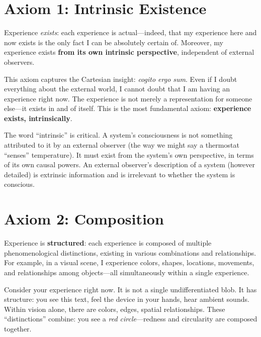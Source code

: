 \documentclass[11pt,a4paper]{report}
\begin{document}
\section{Axiom 1: Intrinsic Existence}

\begin{axiombox}
Experience \emph{exists}: each experience is actual---indeed, that my experience here and now exists is the only fact I can be absolutely certain of. Moreover, my experience exists \textbf{from its own intrinsic perspective}, independent of external observers.
\end{axiombox}

This axiom captures the Cartesian insight: \emph{cogito ergo sum}. Even if I doubt everything about the external world, I cannot doubt that I am having an experience right now. The experience is not merely a representation for someone else---it exists in and of itself. This is the most fundamental axiom: \textbf{experience exists, intrinsically}.

The word ``intrinsic'' is critical. A system's consciousness is not something attributed to it by an external observer (the way we might say a thermostat ``senses'' temperature). It must exist from the system's own perspective, in terms of its own causal powers. An external observer's description of a system (however detailed) is extrinsic information and is irrelevant to whether the system is conscious.

\section{Axiom 2: Composition}

\begin{axiombox}
Experience is \textbf{structured}: each experience is composed of multiple phenomenological distinctions, existing in various combinations and relationships. For example, in a visual scene, I experience colors, shapes, locations, movements, and relationships among objects---all simultaneously within a single experience.
\end{axiombox}

Consider your experience right now. It is not a single undifferentiated blob. It has structure: you see this text, feel the device in your hands, hear ambient sounds. Within vision alone, there are colors, edges, spatial relationships. These ``distinctions'' combine: you see a \emph{red circle}---redness and circularity are composed together.
\end{document}
